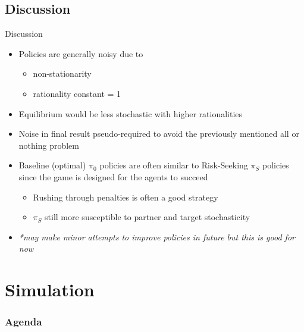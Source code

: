 \documentclass[aspectratio=1610, xcolor=dvipsnames]{packages/beamer}
\newcommand{\displayTOC}{\begin{frame}\frametitle{Agenda} \tableofcontents[currentsection, subsectionstyle=show/show/hide]\end{frame}}
\begin{document}
\subsection{Discussion}\label{subsec:discussion}\begin{frame}{Discussion}
\begin{itemize}
    \item Policies are generally noisy due to
    \begin{itemize}
        \item non-stationarity
        \item rationality constant = 1
    \end{itemize}
    \item Equilibrium would be less stochastic with higher rationalities
    \item Noise in final result pseudo-required to avoid the previously mentioned all or nothing problem
    \item Baseline (optimal) $\pi_0$ policies are often similar to Risk-Seeking $\pi_S$ policies since the game is designed for the agents to succeed
    \begin{itemize}
        \item Rushing through penalties is often a good strategy
        \item $\pi_S$ still more susceptible to partner and target stochasticity
    \end{itemize}
    \item \textit{*may make minor attempts to improve policies in future but this is good for now}
\end{itemize}
\end{frame}
\section{Simulation}\label{sec:simulation} \displayTOC
\end{document}
